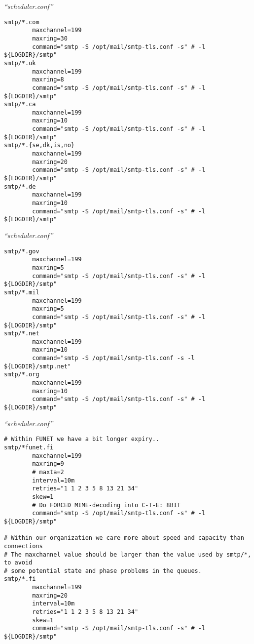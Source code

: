 \documentclass[a4paper,landscape]{slides}
\begin{document}
\begin{overlay}
\small
\centerline{{\em ``scheduler.conf''}}
\tiny
\begin{verbatim}
smtp/*.com
        maxchannel=199
        maxring=30
        command="smtp -S /opt/mail/smtp-tls.conf -s" # -l ${LOGDIR}/smtp"
smtp/*.uk
        maxchannel=199
        maxring=8
        command="smtp -S /opt/mail/smtp-tls.conf -s" # -l ${LOGDIR}/smtp"
smtp/*.ca
        maxchannel=199
        maxring=10
        command="smtp -S /opt/mail/smtp-tls.conf -s" # -l ${LOGDIR}/smtp"
smtp/*.{se,dk,is,no}
        maxchannel=199
        maxring=20
        command="smtp -S /opt/mail/smtp-tls.conf -s" # -l ${LOGDIR}/smtp"
smtp/*.de
        maxchannel=199
        maxring=10
        command="smtp -S /opt/mail/smtp-tls.conf -s" # -l ${LOGDIR}/smtp"
\end{verbatim}
\vfill
\end{overlay}
\begin{overlay}
\small
\centerline{{\em ``scheduler.conf''}}
\tiny
\begin{verbatim}
smtp/*.gov
        maxchannel=199
        maxring=5
        command="smtp -S /opt/mail/smtp-tls.conf -s" # -l ${LOGDIR}/smtp"
smtp/*.mil
        maxchannel=199
        maxring=5
        command="smtp -S /opt/mail/smtp-tls.conf -s" # -l ${LOGDIR}/smtp"
smtp/*.net
        maxchannel=199
        maxring=10
        command="smtp -S /opt/mail/smtp-tls.conf -s -l ${LOGDIR}/smtp.net"
smtp/*.org
        maxchannel=199
        maxring=10
        command="smtp -S /opt/mail/smtp-tls.conf -s" # -l ${LOGDIR}/smtp"
\end{verbatim}
\vfill
\end{overlay}
\begin{overlay}
\small
\centerline{{\em ``scheduler.conf''}}
\tiny
\begin{verbatim}
# Within FUNET we have a bit longer expiry..
smtp/*funet.fi
        maxchannel=199
        maxring=9
        # maxta=2
        interval=10m
        retries="1 1 2 3 5 8 13 21 34"
        skew=1
        # Do FORCED MIME-decoding into C-T-E: 8BIT
        command="smtp -S /opt/mail/smtp-tls.conf -s" # -l ${LOGDIR}/smtp"

# Within our organization we care more about speed and capacity than connections
# The maxchannel value should be larger than the value used by smtp/*, to avoid
# some potential state and phase problems in the queues.
smtp/*.fi
        maxchannel=199
        maxring=20
        interval=10m
        retries="1 1 2 3 5 8 13 21 34"
        skew=1
        command="smtp -S /opt/mail/smtp-tls.conf -s" # -l ${LOGDIR}/smtp"
\end{verbatim}
\vfill
\end{overlay}
\end{document}
